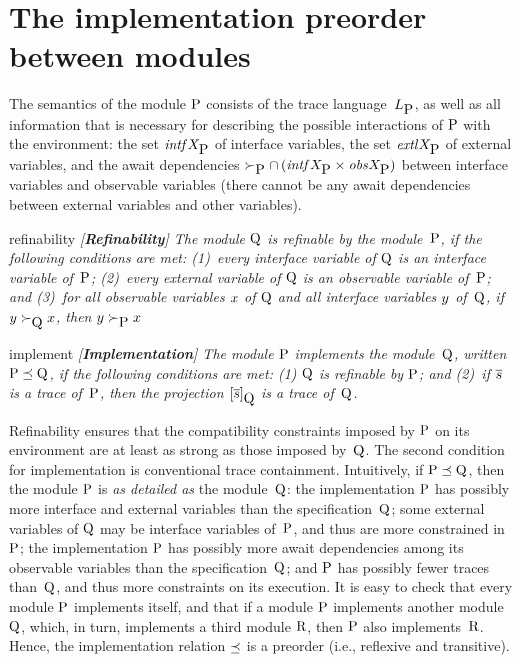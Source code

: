 \section{The implementation preorder between modules}

The semantics of the module $\mbox{P}$ consists of the trace 
language~$L_{\mbox{P}}$, as well as all information that is necessary for
describing the possible interactions of $\mbox{P}$ with the environment:
the set ${\it intf}X_{\mbox{P}}$ of interface variables, the set ${\it extl}X_{\mbox{P}}$ of external
variables, and the await dependencies 
$\succ_{\mbox{P}}\cap\,({\it intf}X_{\mbox{P}}\times{\it obs}X_{\mbox{P}})$ between interface variables 
and observable variables
(there cannot be any await dependencies between external variables and other 
variables).

\begin{definition}{refinability}\it
  {\em [{\bf Refinability}]}
  The module $\mbox{Q}$ is {\em refinable\/} by the module~$\mbox{P}$,
  if the following conditions are met:
  (1)~every interface variable of $\mbox{Q}$ is an interface variable of~$\mbox{P}$;
  (2)~every external variable of $\mbox{Q}$ is an observable variable of~$\mbox{P}$; and
  (3)~for all observable variables $x$ of ${\mbox{Q}}$ and all interface 
    variables $y$ of~${\mbox{Q}}$, if $y\succ_{\mbox{Q}}x$, then 
    $y\succ_{\mbox{P}}x$
\end{definition}

\begin{definition}{implement}\it
  {\em [{\bf Implementation}]}
  The module $\mbox{P}$ {\em implements\/} the module~$\mbox{Q}$, written 
  $\mbox{P}\preceq\mbox{Q}$, if the following conditions are met:
  (1) $\mbox{Q}$ is refinable by $\mbox{P}$; and
  (2)~if $\overline{s}$ is a trace of~$\mbox{P}$, then the projection 
    $[\overline{s}]_{\mbox{Q}}$ is a trace of~$\mbox{Q}$.
\end{definition}


\mypar
Refinability ensures that the compatibility constraints imposed 
by $\mbox{P}$ on its environment are at least as strong as those imposed 
by~$\mbox{Q}$.
The second condition for implementation is conventional trace containment.
Intuitively, if $\mbox{P}\preceq\mbox{Q}$, then the module $\mbox{P}$ is 
{\it as detailed as\/} the module~$\mbox{Q}$: 
the implementation $\mbox{P}$ has possibly more interface and external variables 
than the specification~$\mbox{Q}$;
some external variables of $\mbox{Q}$ may be interface variables of~$\mbox{P}$, and 
thus are more constrained in~$\mbox{P}$;
the implementation $\mbox{P}$ has possibly more await dependencies among its 
observable variables than the specification~$\mbox{Q}$;
and $\mbox{P}$ has possibly fewer traces than~$\mbox{Q}$, and thus more constraints on
its execution.
It is easy to check that every module $\mbox{P}$ implements itself, and that if a 
module $\mbox{P}$ implements another module $\mbox{Q}$, which, in turn, implements a 
third module $\mbox{R}$, then $\mbox{P}$ also implements~$\mbox{R}$.
Hence, the implementation relation $\preceq$ is a preorder 
(i.e., reflexive and transitive).

